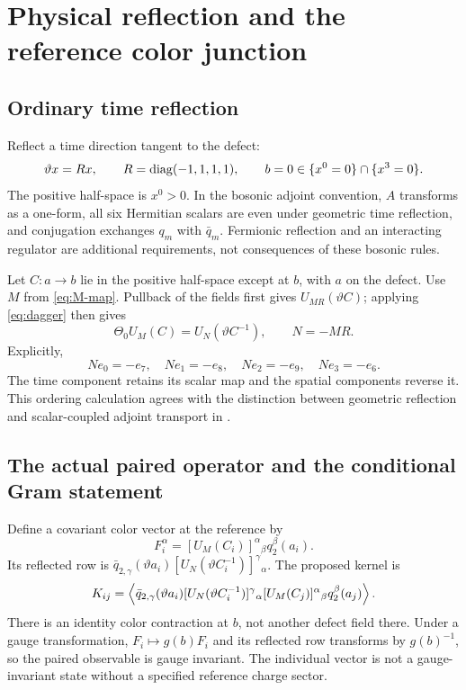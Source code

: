 \section{Physical reflection and the reference color junction}\label{sec:reflection}

\subsection{Ordinary time reflection}

Reflect a time direction tangent to the defect:
\begin{equation}
 \vartheta x=Rx,\qquad R=\operatorname{diag}(-1,1,1,1),\qquad
 b=0\in\{x^0=0\}\cap\{x^3=0\}.
\end{equation}
The positive half-space is $x^0>0$. In the bosonic adjoint convention,
$A$ transforms as a one-form, all six Hermitian scalars are even under
geometric time reflection, and conjugation exchanges $q_m$ with
$\bar q_m$. Fermionic reflection and an interacting regulator are
additional requirements, not consequences of these bosonic rules.

Let $C:a\to b$ lie in the positive half-space except at $b$, with $a$
on the defect. Use $M$ from \eqref{eq:M-map}. Pullback of the fields
first gives $U_{MR}(\vartheta C)$; applying \eqref{eq:dagger} then gives
\begin{equation}\label{eq:reflection-map}
 \Theta_0U_M(C)=U_N(\vartheta C^{-1}),\qquad N=-MR.
\end{equation}
Explicitly,
\begin{equation}
 Ne_0=-e_7,\quad Ne_1=-e_8,\quad Ne_2=-e_9,\quad Ne_3=-e_6.
\end{equation}
The time component retains its scalar map and the spatial components
reverse it. This ordering calculation agrees with the distinction
between geometric reflection and scalar-coupled adjoint transport
in \cite[eqs.~(4)--(7)]{DP}.

\subsection{The actual paired operator and the conditional Gram statement}

Define a covariant color vector at the reference by
\begin{equation}
 F_i^\alpha=[U_M(C_i)]^\alpha{}_{\beta}q_2^\beta(a_i).
\end{equation}
Its reflected row is
$\bar q_{2,\gamma}(\vartheta a_i)
[U_N(\vartheta C_i^{-1})]^\gamma{}_{\alpha}$. The proposed kernel is
\begin{equation}\label{eq:network}
 K_{ij}=\left\langle
 \bar q_{2,\gamma}(\vartheta a_i)
 [U_N(\vartheta C_i^{-1})]^\gamma{}_{\alpha}
 [U_M(C_j)]^\alpha{}_{\beta}q_2^\beta(a_j)\right\rangle.
\end{equation}
There is an identity color contraction at $b$, not another defect
field there. Under a gauge transformation, $F_i\mapsto g(b)F_i$ and
its reflected row transforms by $g(b)^{-1}$, so the paired observable
is gauge invariant. The individual vector is not a gauge-invariant
state without a specified reference charge sector.

